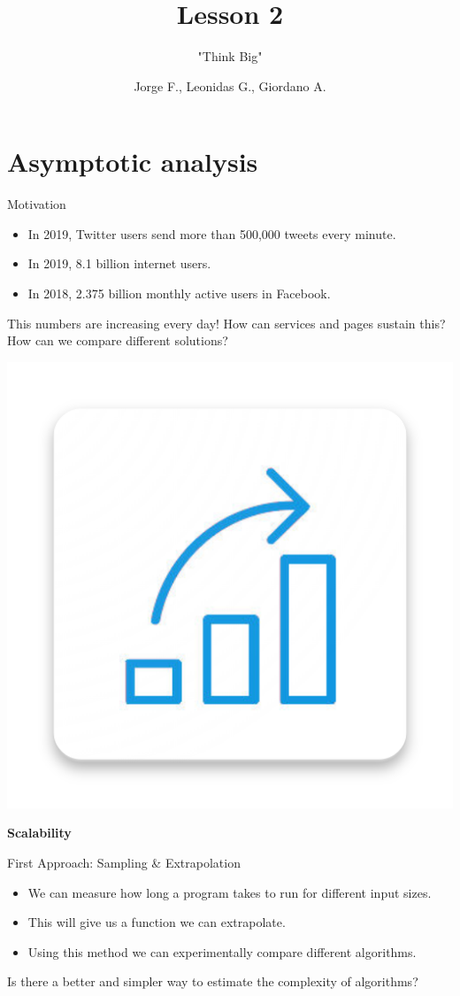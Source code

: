 \documentclass{beamer}
\author{Jorge F., Leonidas G., Giordano A.}
\title{Lesson 2}
\subtitle{"Think Big"}
\institute{UTEC}
\date{}
\begin{document}
\begin{frame}
	\titlepage
\end{frame}


\section{Asymptotic analysis}

\begin{frame}{Motivation}

	\begin{itemize}
		\item In 2019, Twitter users send more than 500,000 tweets every minute.
		\item In 2019, 8.1 billion internet users.
		\item In 2018, 2.375 billion monthly active users in Facebook.
	\end{itemize}

	\begin{center}
		This numbers are increasing every day!
		How can services and pages sustain this?
		How can we compare different solutions?
	\end{center}

	\begin{center}
		\includegraphics[width=0.23\linewidth]{../img/scalability}

		\textbf{Scalability}
	\end{center}

\end{frame}

\begin{frame}{First Approach: Sampling \& Extrapolation}

	\begin{itemize}
		\item We can measure how long a program takes to run for different input sizes.
		\item This will give us a function we can extrapolate.
		\item Using this method we can experimentally compare different algorithms. 
	\end{itemize}

	\begin{center}
		Is there a better and simpler way to estimate the complexity of algorithms?
	\end{center}
\end{frame}
\end{document}
